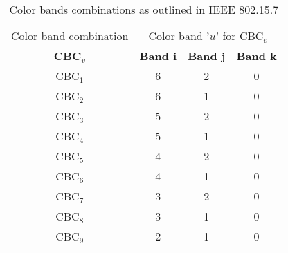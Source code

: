 \renewcommand{\arraystretch}{1.1}
\begin{table}[t]
\centering
\begin{tabular}{|c|c|c|c|}
\hline
Color band combination & \multicolumn{3}{c|}{Color band '$u$' for CBC$_{v}$} \\
\cline{2-4}
\textbf{CBC$_{v}$} & \textbf{Band i} & \textbf{Band j} & \textbf{Band k} \\
\hline
CBC$_{1}$ & 6 & 2 & 0 \\
\hline
CBC$_{2}$ & 6 & 1 & 0 \\
\hline
CBC$_{3}$ & 5 & 2 & 0 \\
\hline
CBC$_{4}$ & 5 & 1 & 0 \\
\hline
CBC$_{5}$ & 4 & 2 & 0 \\
\hline
CBC$_{6}$ & 4 & 1 & 0 \\
\hline
CBC$_{7}$ & 3 & 2 & 0 \\
\hline
CBC$_{8}$ & 3 & 1 & 0 \\
\hline
CBC$_{9}$ & 2 & 1 & 0 \\
\hline
\end{tabular}
\caption{Color bands combinations as outlined in IEEE 802.15.7}
\label{tCBC}
\end{table}
\renewcommand{\arraystretch}{1.0}

